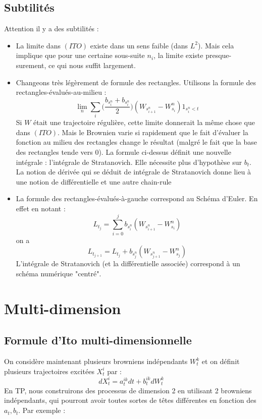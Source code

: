 \documentclass{article}
\begin{document}
\subsection{Subtilités}

 Attention il y a des subtilités :  
 \begin{itemize}
  \item  La limite dans $(ITO)$  existe dans un sens faible (dans $L^2$). Mais cela implique que pour une certaine sous-suite $n_i$, la limite existe presque-surement, ce qui nous suffit largement.  
 \item  Changeons très légèrement de formule des rectangles. Utilisons la formule des rectangles-évalués-au-milieu :
 $$
\lim_n  \sum_{i}    \Big(   \frac {b_{s^n_{i}} +  b_{s^n_{i}}}{2}  \Big)  ( W_{s^n_{i+1}} - W^n_{s_i} )    1_{s^n_i<t} 
$$
Si $W$ était une trajectoire régulière, cette limite donnerait la même chose que dans $(ITO)$. Mais le Brownien varie si rapidement que le fait d'évaluer la fonction au milieu des rectangles change le résultat (malgré le fait que la base des rectangles tende vers 0).  La  formule ci-dessus  définit une nouvelle intégrale : l'intégrale de Stratanovich.  Elle nécessite plus d'hypothèse sur $b_t$. La notion de dérivée qui se déduit de intégrale de Stratanovich  donne lieu à une notion de différentielle et une autre chain-rule 
\item  La formule des rectangles-évalués-à-gauche correspond au Schéma d'Euler. En effet  en notant :
$$
L_{t_j}  = \sum_{i=0}^j   b_{s^n_{i}} ( W_{s^n_{i+1}} - W^n_{s_i} )
$$
on a  
$$
L_{t_{j+1}} = L_{t_j} +  b_{s^n_{j}}  ( W_{s^n_{j+1}} - W^n_{s_j} )
$$
L'intégrale de Stratanovich  (et la différentielle associée) correspond à un  schéma  numérique "centré".

\end{itemize}



\section{Multi-dimension}

\subsection{Formule d'Ito multi-dimensionnelle}

On considère  maintenant plusieurs browniens indépendants $W^k_t$ et on définit   plusieurs trajectoires excitées $X^i_t$ par : 
$$
dX^i_t = a^{ik}_t   dt + b_t^{ik} dW_t^k 
$$
En TP, nous construirons des processus de dimension 2 en utilisant 2 browniens indépendants, qui pourront avoir toutes sortes de têtes différentes en fonction des $a_t,b_t$. Par exemple : 
\end{document}
